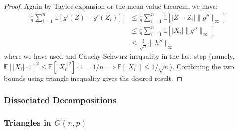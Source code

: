 \documentclass{article}
\begin{document}
\begin{proof}
    Again by Taylor expansion or the mean value theorem, we have:
    \begin{align*}
        \left|\frac{1}{n} \sum_{i=1}^{n} \mathbb{E}[g'(Z) -g'(Z_i)]\right| &\leq \frac{1}{n} \sum_{i=1}^{n} \mathbb{E}[|Z-Z_i| \|g''\|_\infty]\\ 
        &\leq \frac{1}{n} \sum_{i=1}^{n} \mathbb{E}[|X_i| \|g''\|_\infty] \\
        &\leq \frac{2}{\sqrt{n}} \|h''\|_\infty
    \end{align*}
    where we have used  and Cauchy-Schwarz inequality in the last step (namely, $\mathbb{E}[|X_i| \cdot 1]^2 \leq \mathbb{E}[|X_i|^2] \cdot 1=1/n \implies \mathbb{E}[|X_i|]\leq 1/\sqrt{n}$). Combining the two bounds using triangle inequality gives the desired result.
\end{proof}


\subsubsection{Dissociated Decompositions}


\subsubsection{Triangles in $G(n,p)$}


\newpage


\end{document}
